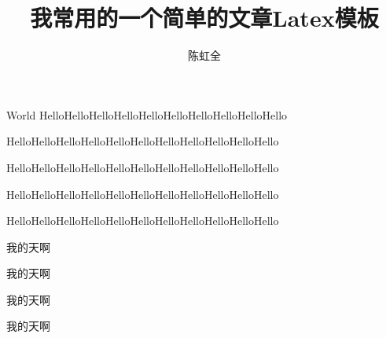 \documentclass{myarticle}
\title{我常用的一个简单的文章Latex模板}
\author{陈虹全}
\begin{document}
\maketitle
\begin{section}{World}
HelloHelloHelloHelloHelloHelloHelloHelloHelloHello

HelloHelloHelloHelloHelloHelloHelloHelloHelloHelloHello

HelloHelloHelloHelloHelloHelloHelloHelloHelloHelloHello

HelloHelloHelloHelloHelloHelloHelloHelloHelloHelloHello

HelloHelloHelloHelloHelloHelloHelloHelloHelloHelloHello

\songti 我的天啊

\kaiti 我的天啊

\heiti 我的天啊

\fangsong 我的天啊

\end{section}
\end{document}
